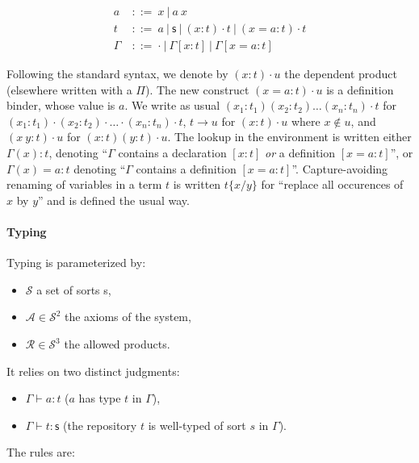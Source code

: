\documentclass{article}
\newcommand{\sort}{\textsf{s}}
\newcommand{\gor}{\ |\ }
\newcommand{\gdecl}[2]{{#1}\ &::=\ {#2}}
\newcommand{\subst}[2]{\{#1/#2\}}
\begin{document}
\begin{align*}
 \gdecl{a}{x \gor a\ x } \\
 \gdecl{t}{a \gor \sort \gor (x:t)\cdot t \gor (x=a:t)\cdot t} \\
 \gdecl{\Gamma}{\cdot \gor \Gamma[x:t] \gor \Gamma[x=a:t]}
\end{align*}

Following the standard syntax, we denote by $(x:t)\cdot u$ the
dependent product (elsewhere written with a $\Pi$). The new construct
$(x=a:t)\cdot u$ is a definition binder, whose value is $a$. We write
as usual $(x_1:t_1)(x_2:t_2)\ldots(x_n:t_n)\cdot t$ for
$(x_1:t_1)\cdot(x_2:t_2)\cdot\ldots\cdot(x_n:t_n)\cdot t$, $t \to u$
for $(x:t)\cdot u$ where $x\notin u$, and $(x\ y : t)\cdot u$ for
$(x:t)(y:t)\cdot u$. The lookup in the environment is written either
$\Gamma(x):t$, denoting ``$\Gamma$ contains a declaration $[x:t]$
\emph{or} a definition $[x=a:t]$'', or $\Gamma(x)=a:t$ denoting
``$\Gamma$ contains a definition $[x=a:t]$''. Capture-avoiding
renaming of variables in a term $t$ is written $t\subst{x}{y}$ for
``replace all occurences of $x$ by $y$'' and is defined the usual way.

\paragraph{Typing} Typing is parameterized by:
\begin{itemize}
  \item$\mathcal S$ a set of sorts \sort,
  \item$\mathcal A \in \mathcal S^2$ the axioms of the system,
  \item$\mathcal R \in \mathcal S^3$ the allowed products.
\end{itemize}
It relies on two distinct judgments:
\begin{itemize}
\item $\Gamma\vdash a : t$ ($a$ has type $t$ in $\Gamma$),
\item $\Gamma\vdash t : \sort$ (the repository $t$ is well-typed of
  sort $s$ in $\Gamma$).
\end{itemize}
The rules are:
\end{document}
